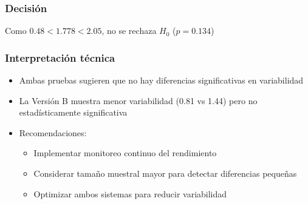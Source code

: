 \subsubsection*{Decisión}
Como $0.48 < 1.778 < 2.05$, no se rechaza $H_0$ ($p = 0.134$)

\subsubsection*{Interpretación técnica}
\begin{itemize}
\item Ambas pruebas sugieren que no hay diferencias significativas en variabilidad
\item La Versión B muestra menor variabilidad (0.81 vs 1.44) pero no estadísticamente significativa
\item Recomendaciones:
\begin{itemize}
\item Implementar monitoreo continuo del rendimiento
\item Considerar tamaño muestral mayor para detectar diferencias pequeñas
\item Optimizar ambos sistemas para reducir variabilidad
\end{itemize}
\end{itemize}